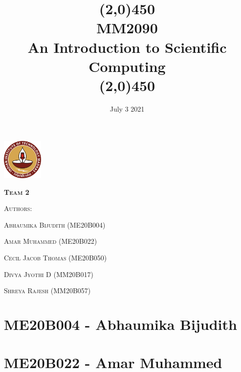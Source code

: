 \documentclass[12pt]{article}
\title{\line(2,0){450}\\ \bfseries{MM2090 \\ An Introduction to Scientific Computing }\\ \line(2,0){450}}
\date{}
\begin{document}
\begin{titlepage}
\maketitle
\begin{center}
	\includegraphics[width=0.15\textwidth]{IITM_pic.png}\par\vspace{1cm}
	\vspace{1cm}
	{\scshape\LARGE \textbf{Team 2} \par}
	\vspace{1cm}
	{\scshape\LARGE Authors: \par}
	\vspace{1cm}
	{\scshape Abhaumika Bijudith (ME20B004) \par}
	\vspace{0.5cm}
	{\scshape Amar Muhammed (ME20B022)     \par}
	\vspace{0.5cm}
	{\scshape Cecil Jacob Thomas (ME20B050) \par}
	\vspace{0.5cm}
	{\scshape Divya Jyothi D (MM20B017)	\par}
	\vspace{0.5cm}
	{\scshape Shreya Rajesh (MM20B057)	\par}
	\vfill
	\vfill

	{\large \date{July 3 2021}\par}
\end{center}
\end{titlepage}

\newpage

\tableofcontents

\newpage

\section{ME20B004 - Abhaumika Bijudith}

\newline
\section{ME20B022 - Amar Muhammed}

\newline
\end{document}
